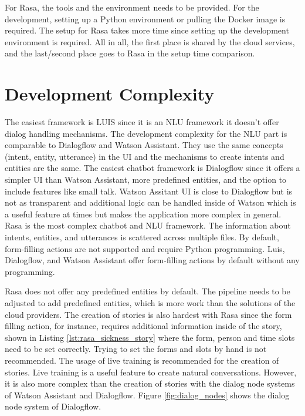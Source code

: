 For Rasa, the tools and the environment needs to be provided.
For the development, setting up a Python environment or pulling the Docker image is required.
The setup for Rasa takes more time since setting up the development environment is required.
All in all, the first place is shared by the cloud services, and the last/second place goes to Rasa in the setup time comparison.

\section*{Development Complexity}
The easiest framework is LUIS since it is an NLU framework it doesn't
offer dialog handling mechanisms.
The development complexity for the NLU part is comparable to Dialogflow and Watson Assistant.
They use the same concepts (intent, entity, utterance) in the UI and the 
mechanisms to create intents and entities are the same.
The easiest chatbot framework is Dialogflow since it offers a simpler UI than Watson Assistant, more predefined entities, and the option to 
include features like small talk.
Watson Assitant UI is close to Dialogflow but is not as transparent 
and additional logic can be handled inside of Watson which is a
useful feature at times but makes the application more complex in general.
Rasa is the most complex chatbot and NLU framework.
The information about intents, entities, and utterances is scattered across multiple files.
By default, form-filling actions are not supported and require Python programming.
Luis, Dialogflow, and Watson Assistant offer form-filling actions by default without any programming.

Rasa does not offer any predefined entities by default.
The pipeline needs to be adjusted to add predefined entities, which is more work than the solutions of the cloud providers.
The creation of stories is also hardest with Rasa since the form filling action, for instance, requires additional information inside of the story, shown in Listing \ref{lst:rasa_sickness_story} where the form, person and time slots need to be set correctly.
Trying to set the forms and slots by hand is not recommended.
The usage of live training is recommended for the creation of stories.
Live training is a useful feature to create natural conversations. However, it is also more complex than the creation of stories with the dialog node systems of Watson Assistant and Dialogflow.
Figure \ref{fig:dialog_nodes} shows the dialog node system of Dialogflow.

